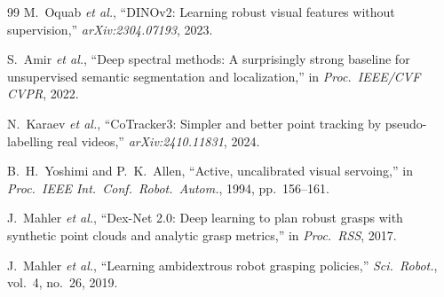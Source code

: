 \documentclass[lettersize,journal]{IEEEtran}
\begin{document}
\begin{thebibliography}{99}
M.~Oquab \emph{et al.},
``DINOv2: Learning robust visual features without supervision,''
\emph{arXiv:2304.07193}, 2023.

S.~Amir \emph{et al.},
``Deep spectral methods: A surprisingly strong baseline for unsupervised
semantic segmentation and localization,''
in \emph{Proc.\ IEEE/CVF CVPR}, 2022.

N.~Karaev \emph{et al.},
``CoTracker3: Simpler and better point tracking by pseudo-labelling real
videos,''
\emph{arXiv:2410.11831}, 2024.

B.~H.~Yoshimi and P.~K.~Allen,
``Active, uncalibrated visual servoing,''
in \emph{Proc.\ IEEE Int.\ Conf.\ Robot.\ Autom.}, 1994, pp.~156--161.

J.~Mahler \emph{et al.},
``Dex-Net 2.0: Deep learning to plan robust grasps with synthetic point
clouds and analytic grasp metrics,''
in \emph{Proc.\ RSS}, 2017.

J.~Mahler \emph{et al.},
``Learning ambidextrous robot grasping policies,''
\emph{Sci.\ Robot.}, vol.~4, no.~26, 2019.

\end{thebibliography}

\vfill
\end{document}
